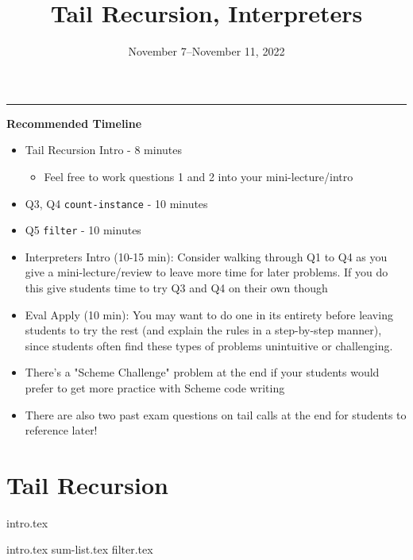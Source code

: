 \documentclass{exam}
\title{Tail Recursion, Interpreters}
\date{November 7--November 11, 2022}
\begin{document}
\maketitle
\rule{\textwidth}{0.15em}
\fontsize{12}{15}\selectfont

\begin{guide}
\begin{blocksection}
    \textbf{Recommended Timeline}
    \begin{itemize}
        \item Tail Recursion Intro - 8 minutes
        \begin{itemize}
            \item Feel free to work questions 1 and 2 into your mini-lecture/intro
        \end{itemize}
        \item Q3, Q4 \lstinline{count-instance} - 10 minutes
        \item Q5 \lstinline{filter} - 10 minutes
        \item Interpreters Intro (10-15 min): Consider walking through Q1 to Q4 as 
        you give a mini-lecture/review to leave more time for later problems. If you do this give students time to try 
        Q3 and Q4 on their own though
        \item Eval Apply (10 min): You may want to do one in its entirety before leaving students to try the rest
        (and explain the rules in a step-by-step manner), since students often find these types of problems unintuitive or challenging.
        \item There's a "Scheme Challenge" problem at the end if your students would prefer to get more practice with Scheme code writing
        \item There are also two past exam questions on tail calls at the end for students to reference later!
    \end{itemize}
\end{blocksection}
\newpage
\end{guide}

\section{Tail Recursion}
{intro.tex}
\begin{questions}
    {intro.tex}
\newpage
    {sum-list.tex}
    {filter.tex}
\end{questions}
\end{document}

